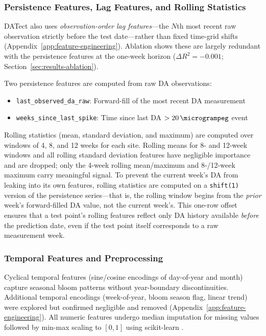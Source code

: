 \documentclass[toxins,article,submit,moreauthors]{Definitions/mdpi}
\begin{document}
\subsubsection{Persistence Features, Lag Features, and Rolling Statistics}

DATect also uses \textit{observation-order lag features}---the $N$th most recent raw observation strictly before the test date---rather than fixed time-grid shifts (Appendix~\ref{app:feature-engineering}). Ablation shows these are largely redundant with the persistence features at the one-week horizon ($\Delta R^2 = -0.001$; Section~\ref{sec:results-ablation}).

Two persistence features are computed from raw DA observations:
\begin{itemize}[nosep]
    \item \texttt{last\_observed\_da\_raw}: Forward-fill of the most recent DA measurement
    \item \texttt{weeks\_since\_last\_spike}: Time since last DA $> \SI{20}{\microgrampeg}$ event
\end{itemize}

Rolling statistics (mean, standard deviation, and maximum) are computed over windows of 4, 8, and 12 weeks for each site. Rolling means for 8- and 12-week windows and all rolling standard deviation features have negligible importance and are dropped; only the 4-week rolling mean/maximum and 8-/12-week maximum carry meaningful signal. To prevent the current week's DA from leaking into its own features, rolling statistics are computed on a \texttt{shift(1)} version of the persistence series---that is, the rolling window begins from the \textit{prior} week's forward-filled DA value, not the current week's. This one-row offset ensures that a test point's rolling features reflect only DA history available \textit{before} the prediction date, even if the test point itself corresponds to a raw measurement week.

\subsubsection{Temporal Features and Preprocessing}

Cyclical temporal features (sine/cosine encodings of day-of-year and month) capture seasonal bloom patterns without year-boundary discontinuities. Additional temporal encodings (week-of-year, bloom season flag, linear trend) were explored but confirmed negligible and removed (Appendix~\ref{app:feature-engineering}). All numeric features undergo median imputation for missing values followed by min-max scaling to $[0, 1]$ using scikit-learn \cite{Pedregosa2011}.
\end{document}
